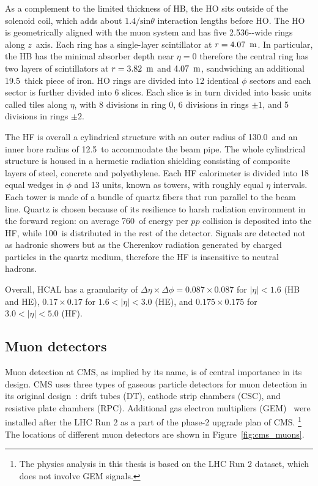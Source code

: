 As a complement to the limited thickness of HB, 
the HO sits outside of the solenoid coil, which adds about $1.4 / \text{sin}\theta$ interaction lengths before HO.
The HO is geometrically aligned with the muon system and has five 2.536-\meter-wide rings along $z$~axis.
Each ring has a single-layer scintillator at $r = 4.07~\meter$.
In particular, the HB has the minimal absorber depth near $\eta = 0$ therefore the central ring has 
two layers of scintillators at $r = 3.82~\meter$ and $4.07~\meter$, sandwiching an additional 19.5~\cm thick piece of iron.
HO rings are divided into 12 identical $\phi$ sectors and each sector is further divided into 6 slices.
Each slice is in turn divided into basic units called tiles along $\eta$, with 8 divisions in ring 0, 6 divisions in rings $\pm 1$, and 5 divisions in rings $\pm 2$. 

The HF is overall a cylindrical structure with an outer radius of 130.0~\cm and an inner bore radius of 12.5~\cm to accommodate the beam pipe.
The whole cylindrical structure is housed in a hermetic radiation shielding consisting of composite layers of steel, concrete and polyethylene. 
Each HF calorimeter is divided into 18 equal wedges in $\phi$ and 13 units, known as towers, with roughly equal $\eta$ intervals. 
Each tower is made of a bundle of quartz fibers that run parallel to the beam line.
Quartz is chosen because of its resilience to harsh radiation environment in the forward region:
on average 760~\GeV of energy per $pp$ collision is deposited into the HF, while 100~\GeV is distributed in the rest of the detector.
Signals are detected not as hadronic showers but as the Cherenkov radiation generated by charged particles in the quartz medium, 
therefore the HF is insensitive to neutral hadrons.

Overall, HCAL has a granularity of $\Delta\eta \times \Delta\phi = 0.087 \times 0.087$ for $|\eta| < 1.6$ (HB and HE), 
$0.17 \times 0.17$ for $1.6 < |\eta| < 3.0$ (HE), and $0.175 \times 0.175$ for $3.0 < |\eta| < 5.0$ (HF).


\subsection{Muon detectors}\label{sec:muon_chambers}

Muon detection at CMS, as implied by its name, is of central importance in its design.
CMS uses three types of gaseous particle detectors for muon detection in its original design~\cite{Collaboration_2008, collaboration_2013}:
drift tubes (DT), cathode strip chambers (CSC), and resistive plate chambers (RPC).
Additional gas electron multipliers (GEM)~\cite{Colaleo:2021453} were installed after the LHC Run 2 as a part of the phase-2 upgrade plan of CMS.
\footnote{The physics analysis in this thesis is based on the LHC Run 2 dataset, which does not involve GEM signals.} 
The locations of different muon detectors are shown in Figure~\ref{fig:cms_muons}.

